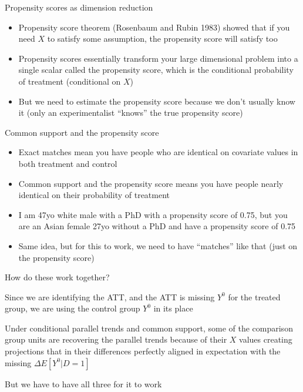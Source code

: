 \documentclass{beamer}
\begin{document}
\begin{frame}{Propensity scores as dimension reduction}

\begin{itemize}

\item Propensity score theorem (Rosenbaum and Rubin 1983) showed that if you need $X$ to satisfy some assumption, the propensity score will satisfy too
\item Propensity scores essentially transform your large dimensional problem into a single scalar called the propensity score, which is the conditional probability of treatment (conditional on $X$)
\item But we need to estimate the propensity score because we don't usually know it (only an experimentalist ``knows'' the true propensity score)

\end{itemize}

\end{frame}

\begin{frame}{Common support and the propensity score}

\begin{itemize}
\item Exact matches mean you have people who are identical on covariate values in both treatment and control
\item Common support and the propensity score means you have people nearly identical on their probability of treatment
\item I am 47yo white male with a PhD with a propensity score of 0.75, but you are an Asian female 27yo without a PhD and have a propensity score of 0.75
\item Same idea, but for this to work, we need to have ``matches'' like that (just on the propensity score)
\end{itemize}

\end{frame}


\begin{frame}{How do these work together?}

Since we are identifying the ATT, and the ATT is missing $Y^0$ for the treated group, we are using the control group $Y^0$ in its place 

\bigskip

Under conditional parallel trends and common support, some of the comparison group units are recovering the parallel trends because of their $X$ values creating projections that in their differences perfectly aligned in expectation with the missing $\Delta E[Y^0|D=1]$

\bigskip

But we have to have all three for it to work

\end{frame}
\end{document}
